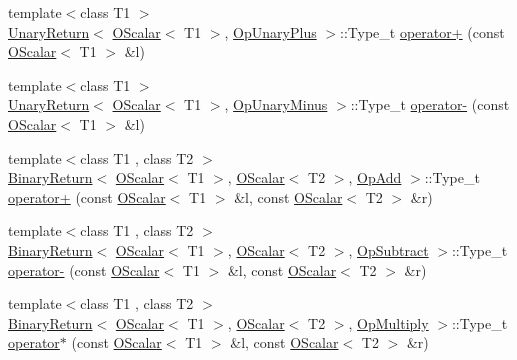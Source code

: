\begin{DoxyCompactItemize}
{\footnotesize template$<$class T1 $>$ }\\\mbox{\hyperlink{structENSEM_1_1UnaryReturn}{Unary\+Return}}$<$ \mbox{\hyperlink{classENSEM_1_1OScalar}{O\+Scalar}}$<$ T1 $>$, \mbox{\hyperlink{structENSEM_1_1OpUnaryPlus}{Op\+Unary\+Plus}} $>$\+::Type\+\_\+t \mbox{\hyperlink{group__obsscalar_gac4378d2fcdd1b512f26ca8549d533809}{operator+}} (const \mbox{\hyperlink{classENSEM_1_1OScalar}{O\+Scalar}}$<$ T1 $>$ \&l)
\item 
{\footnotesize template$<$class T1 $>$ }\\\mbox{\hyperlink{structENSEM_1_1UnaryReturn}{Unary\+Return}}$<$ \mbox{\hyperlink{classENSEM_1_1OScalar}{O\+Scalar}}$<$ T1 $>$, \mbox{\hyperlink{structENSEM_1_1OpUnaryMinus}{Op\+Unary\+Minus}} $>$\+::Type\+\_\+t \mbox{\hyperlink{group__obsscalar_ga4bd7642a04321b074e1d5a47a9e195e4}{operator-\/}} (const \mbox{\hyperlink{classENSEM_1_1OScalar}{O\+Scalar}}$<$ T1 $>$ \&l)
\item 
{\footnotesize template$<$class T1 , class T2 $>$ }\\\mbox{\hyperlink{structENSEM_1_1BinaryReturn}{Binary\+Return}}$<$ \mbox{\hyperlink{classENSEM_1_1OScalar}{O\+Scalar}}$<$ T1 $>$, \mbox{\hyperlink{classENSEM_1_1OScalar}{O\+Scalar}}$<$ T2 $>$, \mbox{\hyperlink{structENSEM_1_1OpAdd}{Op\+Add}} $>$\+::Type\+\_\+t \mbox{\hyperlink{group__obsscalar_gad9d349126080f8e62b28694075f5dd8d}{operator+}} (const \mbox{\hyperlink{classENSEM_1_1OScalar}{O\+Scalar}}$<$ T1 $>$ \&l, const \mbox{\hyperlink{classENSEM_1_1OScalar}{O\+Scalar}}$<$ T2 $>$ \&r)
\item 
{\footnotesize template$<$class T1 , class T2 $>$ }\\\mbox{\hyperlink{structENSEM_1_1BinaryReturn}{Binary\+Return}}$<$ \mbox{\hyperlink{classENSEM_1_1OScalar}{O\+Scalar}}$<$ T1 $>$, \mbox{\hyperlink{classENSEM_1_1OScalar}{O\+Scalar}}$<$ T2 $>$, \mbox{\hyperlink{structENSEM_1_1OpSubtract}{Op\+Subtract}} $>$\+::Type\+\_\+t \mbox{\hyperlink{group__obsscalar_gaf2bbff6744c4daa8183665c15f4052b4}{operator-\/}} (const \mbox{\hyperlink{classENSEM_1_1OScalar}{O\+Scalar}}$<$ T1 $>$ \&l, const \mbox{\hyperlink{classENSEM_1_1OScalar}{O\+Scalar}}$<$ T2 $>$ \&r)
\item 
{\footnotesize template$<$class T1 , class T2 $>$ }\\\mbox{\hyperlink{structENSEM_1_1BinaryReturn}{Binary\+Return}}$<$ \mbox{\hyperlink{classENSEM_1_1OScalar}{O\+Scalar}}$<$ T1 $>$, \mbox{\hyperlink{classENSEM_1_1OScalar}{O\+Scalar}}$<$ T2 $>$, \mbox{\hyperlink{structENSEM_1_1OpMultiply}{Op\+Multiply}} $>$\+::Type\+\_\+t \mbox{\hyperlink{group__obsscalar_gaa61093018ee3eb29e249efd26f29bbdd}{operator$\ast$}} (const \mbox{\hyperlink{classENSEM_1_1OScalar}{O\+Scalar}}$<$ T1 $>$ \&l, const \mbox{\hyperlink{classENSEM_1_1OScalar}{O\+Scalar}}$<$ T2 $>$ \&r)

\end{DoxyCompactItemize}
